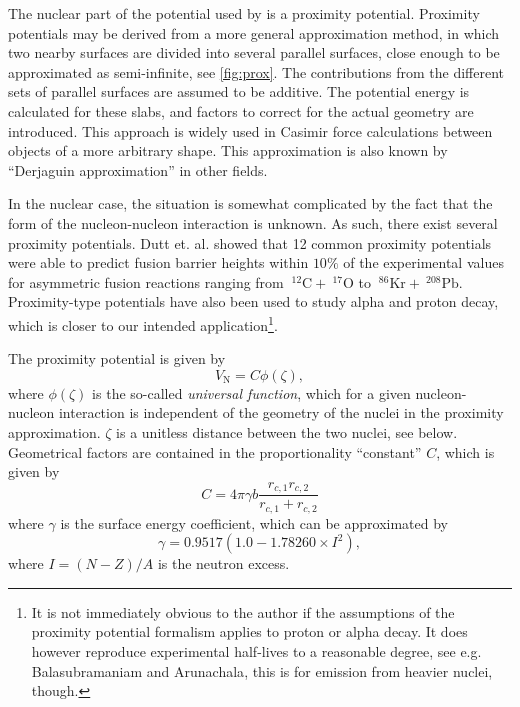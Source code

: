 The nuclear part of the potential used by  is a proximity potential\cite{gollerthan:1988:thesis}\cite{blocki1977}. 
Proximity potentials may be derived from a more general approximation method, in which two nearby surfaces are divided into several parallel surfaces, close enough to be approximated as semi-infinite, see \autoref{fig:prox}\cite{fosco:2012}. The contributions from the different sets of parallel surfaces are assumed to be additive.
The potential energy is calculated for these slabs, and factors to correct for the actual geometry are introduced. This approach is widely used in Casimir force calculations between objects of a more arbitrary shape\cite{fosco:2011}. This approximation is also known by ``Derjaguin approximation'' in other fields\cite{fosco:2012}.

In the nuclear case, the situation is somewhat complicated by the fact that the form of the nucleon-nucleon interaction is unknown. As such, there exist several proximity potentials\cite{dutt:2010}. Dutt et. al. showed that 12 common proximity potentials were able to predict fusion barrier heights within $10\%$ of the experimental values for asymmetric fusion reactions ranging from $~^{12}\mathrm{C} + ~^{17}\mathrm{O}$ to $~^{86}\mathrm{Kr} + ~^{208}\mathrm{Pb}$\cite{dutt:2010}. Proximity-type potentials have also been used to study alpha and proton decay\cite{proton-alpha-proxy:2005}\cite{proton-proxy:2010}, which is closer to our intended application\footnote{It is not immediately obvious to the author if the assumptions of the proximity potential formalism applies to proton or alpha decay. It does however reproduce experimental half-lives to a reasonable degree, see e.g. Balasubramaniam and Arunachala\cite{proton-alpha-proxy:2005}, this is for emission from heavier nuclei, though.}.

The proximity potential is given by
\begin{equation}
V_\text{N} = C \phi(\zeta),\label{eq:vn}
\end{equation}
where $\phi(\zeta)$ is the so-called \emph{universal function}, which for a given nucleon-nucleon interaction is independent of the geometry of the nuclei in the proximity approximation. $\zeta$ is a unitless distance between the two nuclei, see below. Geometrical factors are contained in the proportionality ``constant'' $C$, which is given by
\begin{equation}
C = 4\pi \gamma b \frac{r_{c,1} r_{c,2}}{r_{c,1} + r_{c,2}}
\end{equation}
where $\gamma$ is the surface energy coefficient, which can be approximated by
\begin{equation}
\gamma= 0.9517 (1.0 - 1.78260 \times I^2),
\end{equation}
where $I=(N-Z)/A$ is the neutron excess.

